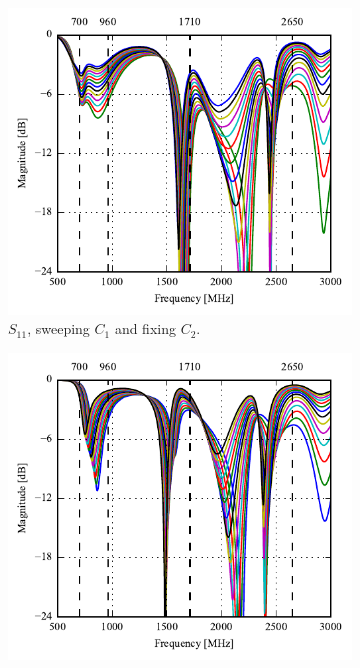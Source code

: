 \begin{figure}[htbp]
   \begin{subfigure}[b]{0.49\linewidth}
        \centering
        \includegraphics{img/tech_sol/monopole/prototype_v1/s11}
        \caption{$S_{11}$, sweeping $C_1$ and fixing $C_2$.}
        \label{fig:ant1_proto_sim_s11}
    \end{subfigure}
    \hfill
    \begin{subfigure}[b]{0.49\linewidth}
        \centering
        \includegraphics{img/tech_sol/monopole/prototype_v1/s22}

\end{subfigure}
\end{figure}
